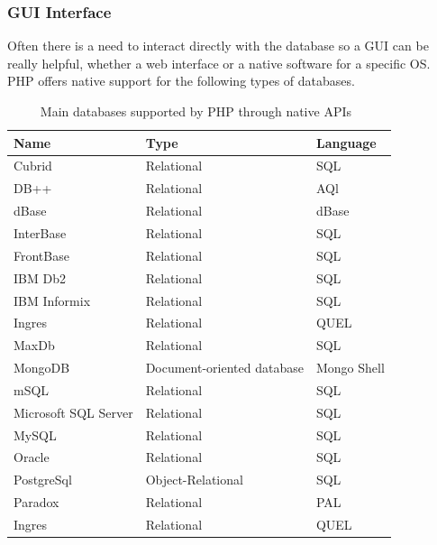 \documentclass[11]{article}
\begin{document}
	\subsubsection{GUI Interface \\}
	Often there is a need to interact directly with the database so a GUI can be really helpful, whether a web interface or a native software for a specific OS.\\

	PHP offers native support for the following types of databases.

		\begin{table}[H]
			\caption{Main databases supported by PHP through native APIs~\citep{PhpDbs}}
			  \centering
				\begin{tabular}{|l|l|l|}
					\hline
					\textbf{Name} & \textbf{Type} & \textbf{Language}\\
					\hline
					Cubrid & Relational & SQL\\
					\hline
					DB++ & Relational & AQl\\
					\hline
					dBase & Relational & dBase\\
					\hline
					InterBase & Relational & SQL\\
					\hline 
					FrontBase & Relational & SQL\\
					\hline 
					IBM Db2 & Relational & SQL\\
					\hline 
					IBM Informix & Relational & SQL\\
					\hline 
					Ingres & Relational & QUEL\\
					\hline 
					MaxDb & Relational & SQL\\
					\hline 
					MongoDB & Document-oriented database & Mongo Shell\\
					\hline 
					mSQL & Relational & SQL\\
					\hline 
					Microsoft SQL Server & Relational & SQL\\
					\hline 
					MySQL& Relational & SQL\\
					\hline 
					Oracle  & Relational & SQL\\
					\hline 
					PostgreSql  & Object-Relational & SQL\\
					\hline 
					Paradox  & Relational & PAL\\
					\hline 
					Ingres & Relational & QUEL\\
					\hline 
				\end{tabular}
		\end{table}
\end{document}
